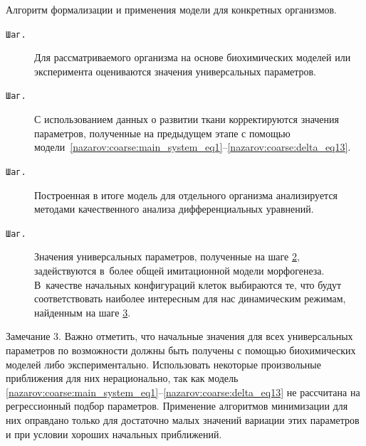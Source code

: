 \smallskip



{\small\sc Алгоритм формализации и применения модели для конкретных организмов.}



\begin{description}





\item[\tt Шаг.\!\!]Для рассматриваемого организма на основе биохимических моделей или эксперимента  оцениваются значения универсальных параметров. 





\item[\tt Шаг.\!\!]\hypertarget{naz:st:2}{}С использованием данных о развитии ткани корректируются значения параметров, полученные на предыдущем этапе с помощью модели~\mbox{\eqref{nazarov:coarse:main_system_eq1}--\eqref{nazarov:coarse:delta_eq13}.}



\item[\tt Шаг.\!\!]\hypertarget{naz:st:3}{}Построенная в итоге модель для отдельного организма анализируется методами качественного анализа дифференциальных уравнений. %



\item[\tt Шаг.\!\!]Значения универсальных параметров, полученные на шаге \hyperlink{naz:st:2}{2}, задействуются в~более общей имитационной модели морфогенеза. В~качестве начальных конфигураций клеток выбираются те, что будут соответствовать наиболее интересным для нас динамическим режимам, найденным на шаге \hyperlink{naz:st:3}{3}.







\end{description}



\smallskip



{\small\sc Замечание 3.} Важно отметить, что начальные значения для всех универсальных параметров по возможности должны быть получены с помощью биохимических моделей либо экспериментально. Использовать  некоторые произвольные приближения для них нерационально, так как модель \eqref{nazarov:coarse:main_system_eq1}--\eqref{nazarov:coarse:delta_eq13} не рассчитана на регрессионный подбор параметров. Применение алгоритмов минимизации для них оправдано только для достаточно малых значений вариации этих параметров и при условии хороших начальных приближений. 

